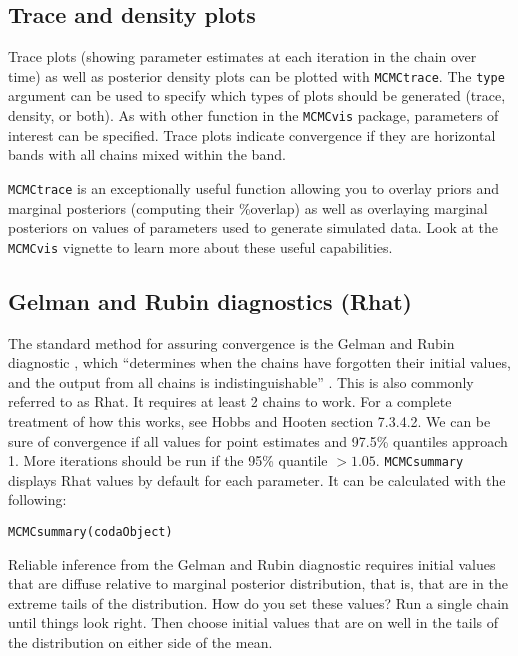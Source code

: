 \documentclass[12pt,english]{article}
\begin{document}
\subsection{Trace and density plots}

Trace plots (showing parameter estimates at each iteration in the chain over time) as well as posterior density plots can be plotted with \texttt{MCMCtrace}. The \texttt{type} argument can be used to specify which types of plots should be generated (trace, density, or both). As with other function in the \texttt{MCMCvis} package, parameters of interest can be specified. Trace plots indicate convergence if they are horizontal bands with all chains mixed within the band.

\texttt{MCMCtrace} is an exceptionally useful function allowing you to overlay priors and marginal posteriors (computing their \%overlap) as well as overlaying marginal posteriors on values of parameters used to generate simulated data.  Look at the \texttt{MCMCvis} vignette to learn more about these useful capabilities. 

\subsection{Gelman and Rubin diagnostics (Rhat)\label{Gelman}}

The standard method for assuring convergence is the Gelman and Rubin diagnostic \citep{Gelman_Rubin}, which \enquote{determines when the chains have forgotten their initial values, and the output from all chains is indistinguishable} \citep{R-Core-Team:2015fk}. This is also commonly referred to as Rhat. It requires at least 2 chains to work. For a complete treatment of how this works, see Hobbs and Hooten \citeyearpar{hobbs2015bayesian} section 7.3.4.2. We can be sure of convergence if all values for point estimates and 97.5\% quantiles approach 1. More iterations should be run if the 95\% quantile $> 1.05$. \texttt{MCMCsummary} displays Rhat values by default for each parameter. It can be calculated with the following:

\begin{Verbatim}
MCMCsummary(codaObject)
\end{Verbatim}

Reliable inference from the Gelman and Rubin diagnostic requires initial values that are diffuse relative to marginal posterior distribution, that is, that are in the extreme tails of the distribution. How do you set these values? Run a single chain until things look right. Then choose initial values that are on well in the tails of the distribution on either side of the mean.
\end{document}
